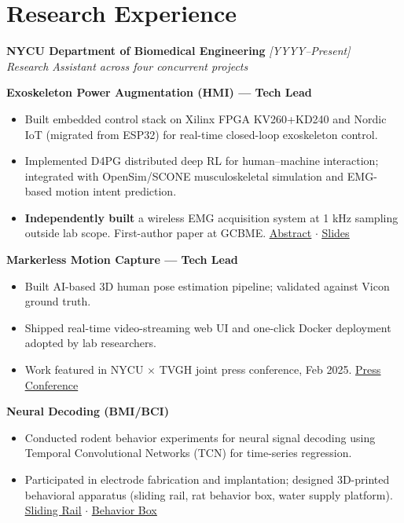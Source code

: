 \documentclass[10pt,a4paper]{article}
\newcommand{\link}[2]{\href{#1}{\underline{#2}}}
\begin{document}
\section*{Research Experience}

\textbf{NYCU Department of Biomedical Engineering} \hfill \textit{[YYYY--Present]}\\
\textit{Research Assistant across four concurrent projects}

\vspace{4pt}
\textbf{Exoskeleton Power Augmentation (HMI) — Tech Lead}
\begin{itemize}
    \item Built embedded control stack on Xilinx FPGA KV260+KD240 and Nordic IoT
    (migrated from ESP32) for real-time closed-loop exoskeleton control.
    \item Implemented D4PG distributed deep RL for human–machine interaction;
    integrated with OpenSim/SCONE musculoskeletal simulation and EMG-based
    motion intent prediction.
    \item \textbf{Independently built} a wireless EMG acquisition system at 1 kHz
    sampling outside lab scope. First-author paper at GCBME.
    \link{https://YOUR-ABSTRACT}{Abstract} $\cdot$
    \link{https://YOUR-SLIDES}{Slides}
\end{itemize}

\textbf{Markerless Motion Capture — Tech Lead}
\begin{itemize}
    \item Built AI-based 3D human pose estimation pipeline; validated against
    Vicon ground truth.
    \item Shipped real-time video-streaming web UI and one-click Docker deployment
    adopted by lab researchers.
    \item Work featured in NYCU $\times$ TVGH joint press conference, Feb 2025.
    \link{https://YOUR-PRESS-VIDEO}{Press Conference}
\end{itemize}

\textbf{Neural Decoding (BMI/BCI)}
\begin{itemize}
    \item Conducted rodent behavior experiments for neural signal decoding using
    Temporal Convolutional Networks (TCN) for time-series regression.
    \item Participated in electrode fabrication and implantation; designed 3D-printed
    behavioral apparatus (sliding rail, rat behavior box, water supply platform).
    \link{https://YOUR-RAIL}{Sliding Rail} $\cdot$
    \link{https://YOUR-BOX}{Behavior Box}
\end{itemize}
\end{document}
